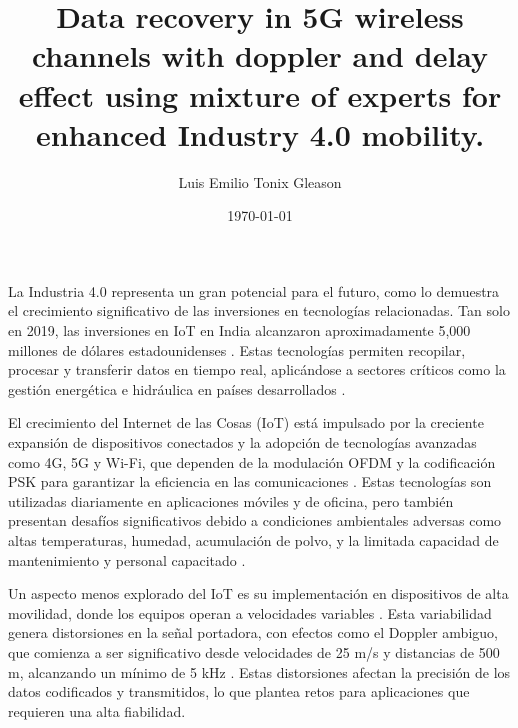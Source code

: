 \documentclass{article}
\title{Data recovery in 5G wireless channels with doppler and delay effect using mixture of experts for enhanced Industry 4.0 mobility.}
\author{Luis Emilio Tonix Gleason}
\date{\today}
\begin{document}
La Industria 4.0 representa un gran potencial para el futuro, como lo demuestra el crecimiento significativo de las inversiones en tecnologías relacionadas. Tan solo en 2019, las inversiones en IoT en India alcanzaron aproximadamente 5,000 millones de dólares estadounidenses \cite{iosr2021iot}. Estas tecnologías permiten recopilar, procesar y transferir datos en tiempo real, aplicándose a sectores críticos como la gestión energética e hidráulica en países desarrollados \cite{Water40}.

El crecimiento del Internet de las Cosas (IoT) está impulsado por la creciente expansión de dispositivos conectados y la adopción de tecnologías avanzadas como 4G, 5G y Wi-Fi, que dependen de la modulación OFDM y la codificación PSK para garantizar la eficiencia en las comunicaciones \cite{10729310}. Estas tecnologías son utilizadas diariamente en aplicaciones móviles y de oficina, pero también presentan desafíos significativos debido a condiciones ambientales adversas como altas temperaturas, humedad, acumulación de polvo, y la limitada capacidad de mantenimiento y personal capacitado \cite{8519869}.

Un aspecto menos explorado del IoT es su implementación en dispositivos de alta movilidad, donde los equipos operan a velocidades variables \cite{10152108}. Esta variabilidad genera distorsiones en la señal portadora, con efectos como el Doppler ambiguo, que comienza a ser significativo desde velocidades de 25 m/s y distancias de 500 m, alcanzando un mínimo de 5 kHz \cite{8022917}. Estas distorsiones afectan la precisión de los datos codificados y transmitidos, lo que plantea retos para aplicaciones que requieren una alta fiabilidad.



\end{document}
